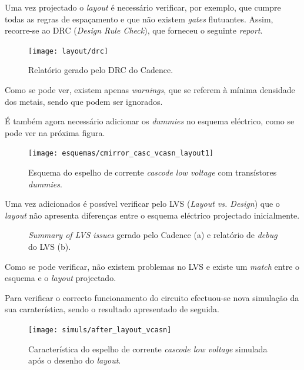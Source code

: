\documentclass[11pt]{article}
\numberwithin{equation}{section}
\begin{document}
Uma vez projectado o \textit{layout} é necessário verificar, por exemplo, que cumpre todas as regras de espaçamento e que não existem \textit{gates} flutuantes. Assim, recorre-se ao DRC (\textit{Design Rule Check}), que forneceu o seguinte \textit{report}.

\begin{figure}[H]
	\centering
	\texttt{[image: layout/drc]}
	\vspace{-0.8em}
	\caption{Relatório gerado pelo DRC do Cadence.}
	\vspace{-0.8em}
\end{figure}

Como se pode ver, existem apenas \textit{warnings}, que se referem à mínima densidade dos metais, sendo que podem ser ignorados.

É também agora necessário adicionar os \textit{dummies} no esquema eléctrico, como se pode ver na próxima figura. 

\begin{figure}[H]
	\centering
	\texttt{[image: esquemas/cmirror\_casc\_vcasn\_layout1]}
	\vspace{-0.8em}
	\caption{Esquema do espelho de corrente \textit{cascode low voltage} com transístores \textit{dummies}.}
	\vspace{-0.8em}
\end{figure}

Uma vez adicionados é possível verificar pelo LVS (\textit{Layout vs. Design}) que o \textit{layout} não apresenta diferenças entre o esquema eléctrico projectado inicialmente.

\begin{figure}[H]
	\centering
	\hspace{2mm}
	\vspace{-0.8em}
	\caption{\textit{Summary of LVS issues} gerado pelo Cadence (a) e relatório de \textit{debug} do LVS (b).}
	\vspace{-0.8em}
\end{figure}

Como se pode verificar, não existem problemas no LVS e existe um \textit{match} entre o esquema e o \textit{layout} projectado.

Para verificar o correcto funcionamento do circuito efectuou-se nova simulação da sua caraterística, sendo o resultado apresentado de seguida.

\begin{figure}[H]
	\centering
	\texttt{[image: simuls/after\_layout\_vcasn]}
	\vspace{-0.8em}
	\caption{Característica do espelho de corrente \textit{cascode low voltage} simulada após o desenho do \textit{layout}.}
	\vspace{-0.8em}
\end{figure}
\end{document}
